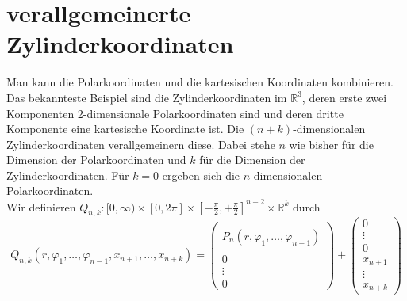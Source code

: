 \documentclass[a4paper,11pt]{report}
\theoremstyle{definition}
\newcommand{\R}{{\ensuremath{\mathbb{R}}}}
\begin{document}
\section{verallgemeinerte Zylinderkoordinaten}
Man kann die Polarkoordinaten und die kartesischen Koordinaten kombinieren. Das bekannteste Beispiel sind die Zylinderkoordinaten im $\R^3$, deren erste zwei Komponenten 2-dimensionale Polarkoordinaten sind und deren dritte Komponente eine kartesische Koordinate ist. Die $(n+k)$-dimensionalen Zylinderkoordinaten verallgemeinern diese. Dabei stehe $n$ wie bisher für die Dimension der Polarkoordinaten und $k$ für die Dimension der Zylinderkoordinaten. Für $k=0$ ergeben sich die $n$-dimensionalen Polarkoordinaten.\\
Wir definieren $Q_{n,k}:[0,\infty)\times[0, 2\pi]\times[-\frac{\pi}{2},+\frac{\pi}{2}]^{n-2}\times \R^k$ durch
$$Q_{n,k}(r,\varphi_1,\ldots,\varphi_{n-1}, x_{n+1}, \ldots, x_{n+k})=
\begin{pmatrix} \\ P_n(r,\varphi_1,\ldots,\varphi_{n-1}) \\ \\ 0 \\ \vdots \\ 0 \end{pmatrix}
+ \begin{pmatrix} 0 \\ \vdots \\ 0 \\ x_{n+1} \\ \vdots \\ x_{n+k} \end{pmatrix}$$
\end{document}
